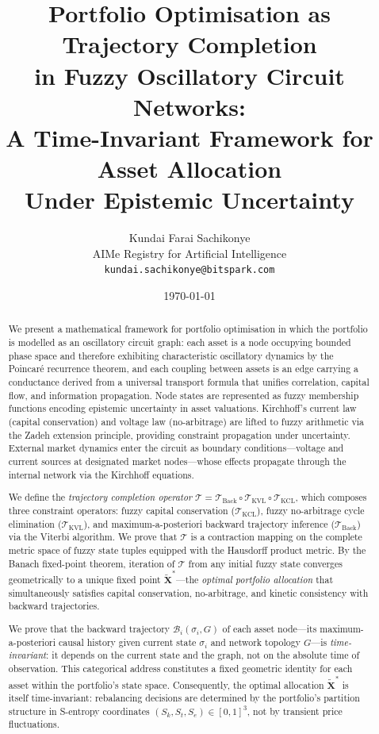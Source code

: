 \documentclass[twocolumn,10pt]{article}
\title{Portfolio Optimisation as Trajectory Completion \\ in Fuzzy Oscillatory Circuit Networks: \\ A Time-Invariant Framework for Asset Allocation \\ Under Epistemic Uncertainty}
\author{
    Kundai Farai Sachikonye\\
    AIMe Registry for Artificial Intelligence\\
    \texttt{kundai.sachikonye@bitspark.com}
}
\date{\today}
\theoremstyle{remark}
\newcommand{\fuzzy}[1]{\tilde{#1}}
\newcommand{\Tkcl}{\mathcal{T}_{\mathrm{KCL}}}
\newcommand{\Tkvl}{\mathcal{T}_{\mathrm{KVL}}}
\newcommand{\Tback}{\mathcal{T}_{\mathrm{Back}}}
\newcommand{\Tcomp}{\mathcal{T}}
\begin{document}
\maketitle

\begin{abstract}
We present a mathematical framework for portfolio optimisation in which the portfolio is modelled as an oscillatory circuit graph: each asset is a node occupying bounded phase space and therefore exhibiting characteristic oscillatory dynamics by the Poincar\'{e} recurrence theorem, and each coupling between assets is an edge carrying a conductance derived from a universal transport formula that unifies correlation, capital flow, and information propagation.  Node states are represented as fuzzy membership functions encoding epistemic uncertainty in asset valuations.  Kirchhoff's current law (capital conservation) and voltage law (no-arbitrage) are lifted to fuzzy arithmetic via the Zadeh extension principle, providing constraint propagation under uncertainty.  External market dynamics enter the circuit as boundary conditions---voltage and current sources at designated market nodes---whose effects propagate through the internal network via the Kirchhoff equations.

We define the \emph{trajectory completion operator} $\Tcomp = \Tback \circ \Tkvl \circ \Tkcl$, which composes three constraint operators: fuzzy capital conservation ($\Tkcl$), fuzzy no-arbitrage cycle elimination ($\Tkvl$), and maximum-a-posteriori backward trajectory inference ($\Tback$) via the Viterbi algorithm.  We prove that $\Tcomp$ is a contraction mapping on the complete metric space of fuzzy state tuples equipped with the Hausdorff product metric.  By the Banach fixed-point theorem, iteration of $\Tcomp$ from any initial fuzzy state converges geometrically to a unique fixed point $\fuzzy{\mathbf{X}}^*$---the \emph{optimal portfolio allocation} that simultaneously satisfies capital conservation, no-arbitrage, and kinetic consistency with backward trajectories.

We prove that the backward trajectory $\mathcal{B}_i(\sigma_i, G)$ of each asset node---its maximum-a-posteriori causal history given current state $\sigma_i$ and network topology $G$---is \emph{time-invariant}: it depends on the current state and the graph, not on the absolute time of observation.  This categorical address constitutes a fixed geometric identity for each asset within the portfolio's state space.  Consequently, the optimal allocation $\fuzzy{\mathbf{X}}^*$ is itself time-invariant: rebalancing decisions are determined by the portfolio's partition structure in S-entropy coordinates $(S_k, S_t, S_e) \in [0,1]^3$, not by transient price fluctuations.


\end{abstract}
\end{document}
